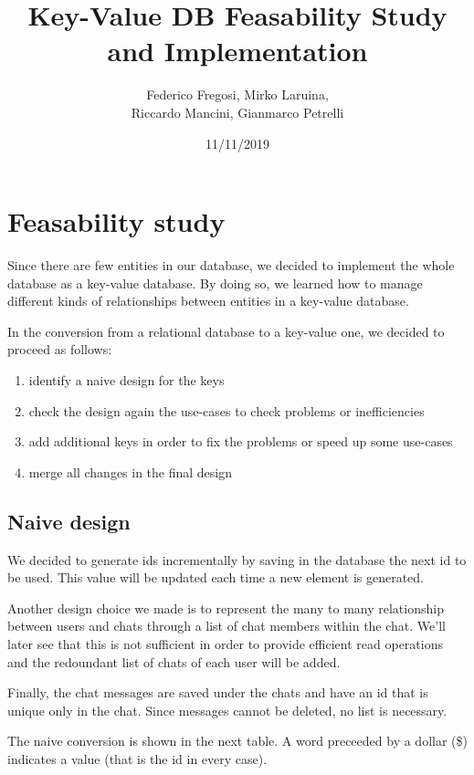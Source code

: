 \documentclass[10pt]{article}
\title{Key-Value DB Feasability Study and Implementation}
\date{11/11/2019}
\author{Federico Fregosi, Mirko Laruina,\\
        Riccardo Mancini, Gianmarco Petrelli}
\begin{document}
\maketitle
\vfill
\setcounter{tocdepth}{2}
\tableofcontents
\vfill
\clearpage
\setcounter{page}{1}

\section{Feasability study}

Since there are few entities in our database, we decided to implement the whole 
database as a key-value database. By doing so, we learned how to manage different
kinds of relationships between entities in a key-value database.

In the conversion from a relational database to a key-value one, we decided to 
proceed as follows:
\begin{enumerate}
    \item identify a naive design for the keys
    \item check the design again the use-cases to check problems or 
        inefficiencies
    \item add additional keys in order to fix the problems or speed up some use-cases
    \item merge all changes in the final design
\end{enumerate}

\subsection{Naive design}
We decided to generate ids incrementally by saving in the database the next id
to be used. This value will be updated each time a new element is generated.

Another design choice we made is to represent the many to many relationship 
between users and chats through a list of chat members within the chat. We'll
later see that this is not sufficient in order to provide efficient read 
operations and the redoundant list of chats of each user will be added.

Finally, the chat messages are saved under the chats and have an id that is 
unique only in the chat. Since messages cannot be deleted, no list is necessary.

The naive conversion is shown in the next table. A word preceeded by a dollar 
(\$) indicates a value (that is the id in every case).
\end{document}
